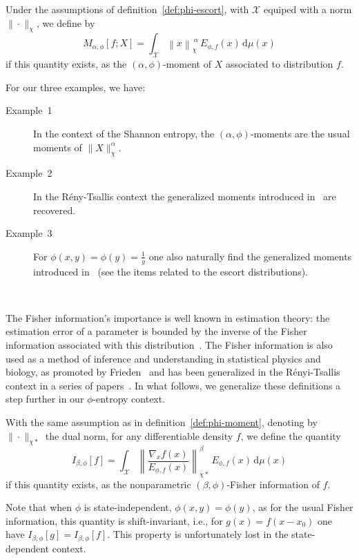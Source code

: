 \documentclass[entropy,article,submit,moreauthors,pdftex]{Definitions/mdpi}
\def\dmu{\mathrm{d}\mu}
\def\X{\mathcal{X}}
\begin{document}
\begin{Definition}
\label{def:phi-moment}
%
  Under the  assumptions of  definition~\ref{def:phi-escort}, with  $\X$ equiped
  with a norm $\| \cdot \|_\chi$, we define by
  \begin{equation}\label{eq:phi-moment}
  M_{\alpha,\phi}[f;X] = \int_\X \left\| x \right\|_\chi^{\: \alpha} \,
  E_{\phi,f}(x) \, \dmu(x)
  \end{equation}
  if this  quantity exists, as  the $(\alpha,\phi)$-moment of $X$  associated to
  distribution $f$.
\end{Definition}
%
For our three examples, we have:
%
\begin{description}
\item[Example~1]    In   the    context    of   the    Shannon   entropy,    the
  $(\alpha,\phi)$-moments are the usual moments of $\|X\|_\chi^\alpha$.
%
\item[Example~2]   In  the  R\'eny-Tsallis   context  the   generalized  moments
  introduced in~\cite{TsaMen98, MarNic00} are recovered.
%
\item[Example~3] For $\phi(x,y) = \phi(y) = \frac{1}{y}$ one also naturally find
  the generalized moments introduced in~\cite{TsaMen98, MarNic00} (see the items
  related to the escort distributions).
\end{description}


\

The  Fisher information's  importance is  well known  in estimation  theory: the
estimation  error  of a  parameter  is  bounded by  the  inverse  of the  Fisher
information associated with this distribution~\cite{Kay93, CovTho06}. The Fisher
information  is  also  used  as  a method  of  inference  and  understanding  in
statistical physics  and biology,  as promoted  by Frieden~\cite{Fri04}  and has
been   generalized   in   the   R\'enyi-Tsallis   context   in   a   series   of
papers~\cite{Ham78,   ChiPen00,   CasChi02,  LutYan05,   LutLv12,   Ber12:06_1,
  Ber12:06_2, Ber13}.  In  what follows, we generalize these  definitions a step
further in our $\phi$-entropy context.


\begin{Definition}
\label{def:np-phi-Fisher}
%
  With the  same assumption  as in definition~\ref{def:phi-moment},  denoting by
  $\| \cdot  \|_{\chi*}$ the dual norm,  for any differentiable density  $f$, we
  define the quantity
  \begin{equation}\label{eq:np-phi-Fisher}
  I_{\beta,\phi}[f] = \int_\X \left\| \frac{\nabla_x f(x)}{E_{\phi,f}(x)}
    \right\|_{\chi*}^\beta \, E_{\phi,f}(x) \, \dmu(x)
  \end{equation}
  if   this  quantity   exists,  as   the   nonparametric  $(\beta,\phi)$-Fisher
  information of $f$.
\end{Definition}
%
Note that  when $\phi$ is state-independent,  $\phi(x,y) = \phi(y)$, as  for the
usual Fisher  information, this quantity  is shift-invariant, i.e., for  $g(x) =
f(x-x_0)$  one have  $I_{\beta,\phi}[g] =  I_{\beta,\phi}[f]$. This  property is
unfortunately lost in the state-dependent context.
\end{document}
